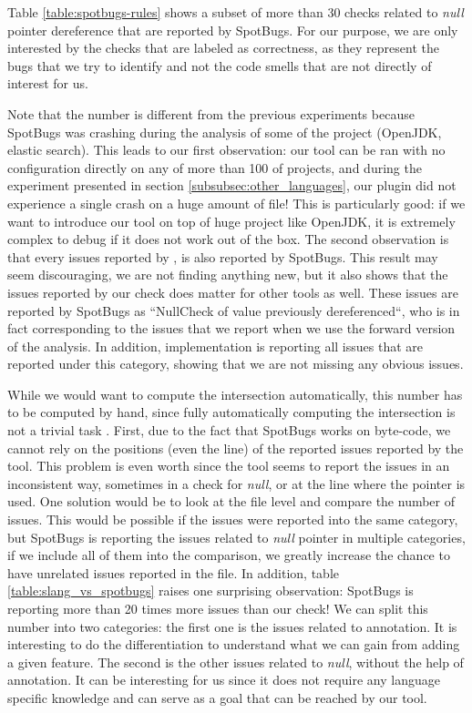 Table \ref{table:spotbugs-rules} shows a subset of more than 30 checks related to \emph{null} pointer dereference that are reported by SpotBugs. 
For our purpose, we are only interested by the checks that are labeled as correctness, as they represent the bugs that we try to identify and not the code smells that are not directly of interest for us. 

Note that the number is different from the previous experiments because SpotBugs was crashing during the analysis of some of the project (OpenJDK, elastic search). 
This leads to our first observation: our tool can be ran with no configuration directly on any of more than 100 of projects, and during the experiment presented in section \ref{subsubsec:other_languages}, our plugin did not experience a single crash on a huge amount of file!
This is particularly good: if we want to introduce our tool on top of huge project like OpenJDK, it is extremely complex to debug if it does not work out of the box.
The second observation is that every issues reported by \slang{}, is also reported by SpotBugs. 
This result may seem discouraging, we are not finding anything new, but it also shows that the issues reported by our check does matter for other tools as well. 
These issues are reported by SpotBugs as “NullCheck of value previously dereferenced“, who is in fact corresponding to the issues that we report when we use the forward version of the analysis. 
In addition, \slang{} implementation is reporting all issues that are reported under this category, showing that we are not missing any obvious issues.

While we would want to compute the intersection automatically, this number has to be computed by hand, since fully automatically computing the intersection is not a trivial task \cite{Gabel:2010:OIE:1806799.1806806}. 
First, due to the fact that SpotBugs works on byte-code, we cannot rely on the positions (even the line) of the reported issues reported by the tool. 
This problem is even worth since the tool seems to report the issues in an inconsistent way, sometimes in a check for \emph{null}, or at the line where the pointer is used. 
One solution would be to look at the file level and compare the number of issues. 
This would be possible if the issues were reported into the same category, but SpotBugs is reporting the issues related to \emph{null} pointer in multiple categories, if we include all of them into the comparison, we greatly increase the chance to have unrelated issues reported in the file. \newline
In addition, table \ref{table:slang_vs_spotbugs} raises one surprising observation: SpotBugs is reporting more than 20 times more issues than our check!
We can split this number into two categories: the first one is the issues related to annotation. 
It is interesting to do the differentiation to understand what we can gain from adding a given feature. 
The second is the other issues related to \emph{null}, without the help of annotation. 
It can be interesting for us since it does not require any language specific knowledge and can serve as a goal that can be reached by our tool.


